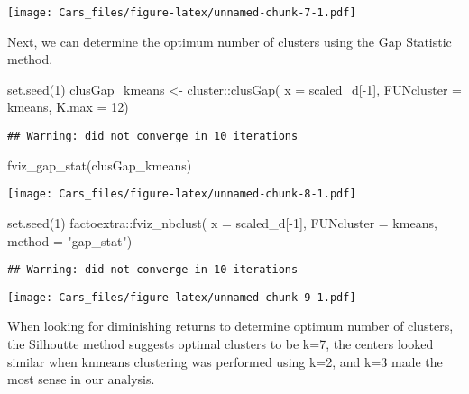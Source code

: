 \documentclass[
]{article}
\newenvironment{Shaded}{\begin{snugshade}}{\end{snugshade}}
\newcommand{\AttributeTok}[1]{\textcolor[rgb]{0.77,0.63,0.00}{#1}}
\newcommand{\DecValTok}[1]{\textcolor[rgb]{0.00,0.00,0.81}{#1}}
\newcommand{\FunctionTok}[1]{\textcolor[rgb]{0.00,0.00,0.00}{#1}}
\newcommand{\NormalTok}[1]{#1}
\newcommand{\OtherTok}[1]{\textcolor[rgb]{0.56,0.35,0.01}{#1}}
\newcommand{\SpecialCharTok}[1]{\textcolor[rgb]{0.00,0.00,0.00}{#1}}
\newcommand{\StringTok}[1]{\textcolor[rgb]{0.31,0.60,0.02}{#1}}
\begin{document}
\texttt{[image: Cars\_files/figure-latex/unnamed-chunk-7-1.pdf]}

Next, we can determine the optimum number of clusters using the Gap
Statistic method.

\begin{Shaded}
\begin{Highlighting}[]
\FunctionTok{set.seed}\NormalTok{(}\DecValTok{1}\NormalTok{)}
\NormalTok{clusGap\_kmeans }\OtherTok{\textless{}{-}}\NormalTok{ cluster}\SpecialCharTok{::}\FunctionTok{clusGap}\NormalTok{(}
  \AttributeTok{x =}\NormalTok{ scaled\_d[}\SpecialCharTok{{-}}\DecValTok{1}\NormalTok{],  }
  \AttributeTok{FUNcluster =}\NormalTok{ kmeans,  }
  \AttributeTok{K.max =} \DecValTok{12}\NormalTok{)}
\end{Highlighting}
\end{Shaded}

\begin{verbatim}
## Warning: did not converge in 10 iterations
\end{verbatim}

\begin{Shaded}
\begin{Highlighting}[]
\FunctionTok{fviz\_gap\_stat}\NormalTok{(clusGap\_kmeans)}
\end{Highlighting}
\end{Shaded}

\texttt{[image: Cars\_files/figure-latex/unnamed-chunk-8-1.pdf]}

\begin{Shaded}
\begin{Highlighting}[]
\FunctionTok{set.seed}\NormalTok{(}\DecValTok{1}\NormalTok{)}
\NormalTok{factoextra}\SpecialCharTok{::}\FunctionTok{fviz\_nbclust}\NormalTok{(  }
  \AttributeTok{x =}\NormalTok{ scaled\_d[}\SpecialCharTok{{-}}\DecValTok{1}\NormalTok{],  }
  \AttributeTok{FUNcluster =}\NormalTok{ kmeans,  }
  \AttributeTok{method =} \StringTok{"gap\_stat"}\NormalTok{)}
\end{Highlighting}
\end{Shaded}

\begin{verbatim}
## Warning: did not converge in 10 iterations
\end{verbatim}

\texttt{[image: Cars\_files/figure-latex/unnamed-chunk-9-1.pdf]}

When looking for diminishing returns to determine optimum number of
clusters, the Silhoutte method suggests optimal clusters to be k=7, the
centers looked similar when knmeans clustering was performed using k=2,
and k=3 made the most sense in our analysis.
\end{document}
